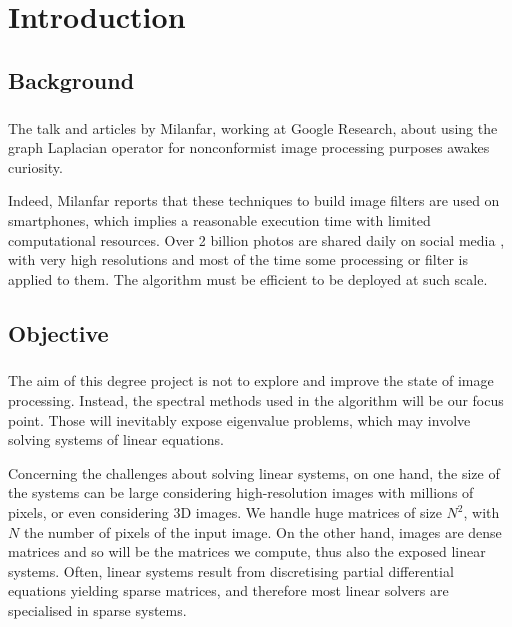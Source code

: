 \chapter{Introduction}

\section{Background}

\paragraph{}
The talk \cite{siam_slides_2016} and articles \cite{glide_2014} \cite{talebi_nonlocal_2014} by Milanfar, working at Google Research, about using the graph Laplacian operator for nonconformist image processing purposes awakes curiosity.

Indeed, Milanfar reports that these techniques to build image filters are used on smartphones, which implies a reasonable execution time with limited computational resources.
Over 2 billion photos are shared daily on social media \cite{siam_slides_2016}, with very high resolutions and most of the time some processing or filter is applied to them.
The algorithm must be efficient to be deployed at such scale.

\section{Objective}

\paragraph{}
The aim of this degree project is not to explore and improve the state of image processing.
Instead, the spectral methods used in the algorithm will be our focus point.
Those will inevitably expose eigenvalue problems, which may involve solving systems of linear equations.

Concerning the challenges about solving linear systems, on one hand, the size of the systems can be large considering high-resolution images with millions of pixels, or even considering 3D images.
We handle huge matrices of size \(N^2\), with \(N\) the number of pixels of the input image.
On the other hand, images are dense matrices and so will be the matrices we compute, thus also the exposed linear systems.
Often, linear systems result from discretising partial differential equations yielding sparse matrices, and therefore most linear solvers are specialised in sparse systems.

